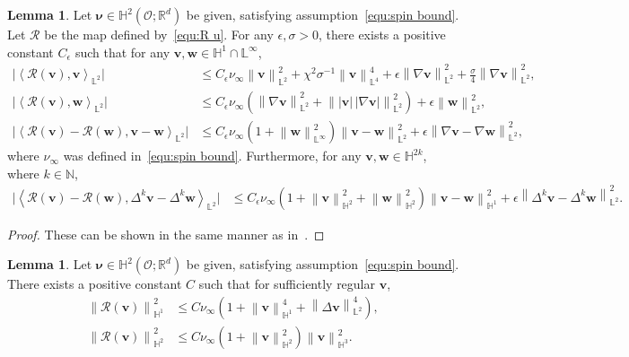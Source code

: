 \documentclass[11pt, reqno]{amsart}
\theoremstyle{definition}
\newtheorem{lemma}[theorem]{Lemma}
\numberwithin{equation}{section}
\newcommand{\bff}{\boldsymbol}
\newcommand{\bb}{\mathbb}
\newcommand{\norm}[2]{\left\|{#1}\right\|_{#2}}
\newcommand{\inpro}[2]{\left\langle#1,#2\right\rangle}
\begin{document}
\begin{lemma}
	Let $\bff{\nu}\in \bb{H}^2(\mathscr{O};\bb{R}^d)$ be given, satisfying assumption~\eqref{equ:spin bound}. Let $\mathcal{R}$ be the map defined by~\eqref{equ:R u}.
	For any $\epsilon, \sigma>0$, there exists a positive constant $C_\epsilon$ such that for any $\bff{v}, \bff{w} \in \bb{H}^1 \cap \bb{L}^\infty$,
	\begin{align}
        \label{equ:Rv v L2}
        \big| \inpro{\mathcal{R}(\bff{v})}{\bff{v}}_{\bb{L}^2} \big|
        &\leq
        C_\epsilon \nu_\infty \norm{\bff{v}}{\bb{L}^2}^2
        +
        \chi^2 \sigma^{-1} \norm{\bff{v}}{\bb{L}^4}^4
        +
        \epsilon \norm{\nabla \bff{v}}{\bb{L}^2}^2
		+
		\frac{\sigma}{4} \norm{\nabla \bff{v}}{\bb{L}^2}^2,
        \\
		\label{equ:Rv w}
		\big| \inpro{\mathcal{R}(\bff{v})}{\bff{w}}_{\bb{L}^2} \big|
		&\leq
		C_\epsilon \nu_\infty
		\left( \norm{\nabla \bff{v}}{\bb{L}^2}^2
		+
		\norm{|\bff{v}|\, |\nabla \bff{v}|}{\bb{L}^2}^2 \right)
		+
		\epsilon \norm{\bff{w}}{\bb{L}^2}^2,
		\\
		\label{equ:Rvw vw}
		\big| \inpro{\mathcal{R}(\bff{v})-\mathcal{R}(\bff{w})}{\bff{v}-\bff{w}}_{\bb{L}^2} \big|
		&\leq
		C_\epsilon \nu_\infty \left(1+\norm{\bff{w}}{\bb{L}^\infty}^2 \right)
		\norm{\bff{v}-\bff{w}}{\bb{L}^2}^2
		+
		\epsilon \norm{\nabla \bff{v}-\nabla \bff{w}}{\bb{L}^2}^2,
	\end{align}
 where $\nu_\infty$ was defined in~\eqref{equ:spin bound}. Furthermore, for any $\bff{v},\bff{w}\in \bb{H}^{2k}$, where $k\in \bb{N}$,
        \begin{align}
        \label{equ:Rvw Delta k}
        \Big| \inpro{\mathcal{R}(\bff{v})-\mathcal{R}(\bff{w})}{\Delta^k \bff{v}- \Delta^k \bff{w}}_{\bb{L}^2} \Big|
		&\leq
        C_\epsilon \nu_\infty \left(1+\norm{\bff{v}}{\bb{H}^2}^2+ \norm{\bff{w}}{\bb{H}^2}^2 \right) \norm{\bff{v}-\bff{w}}{\bb{H}^1}^2
        +
        \epsilon \norm{\Delta^k \bff{v}-\Delta^k \bff{w}}{\bb{L}^2}^2.
        \end{align}
\end{lemma}

\begin{proof}
	These can be shown in the same manner as in~\cite[Lemma~2.3]{GolSoeTra24b}.
\end{proof}

\begin{lemma}
Let $\bff{\nu}\in \bb{H}^2(\mathscr{O};\bb{R}^d)$ be given, satisfying assumption~\eqref{equ:spin bound}. There exists a positive constant $C$ such that for sufficiently regular $\bff{v}$,
\begin{align}
    \label{equ:nab Rv nab w}
        \norm{\mathcal{R}(\bff{v})}{\bb{H}^1}^2
        &\leq
       C \nu_\infty \left(1+ \norm{\bff{v}}{\bb{H}^1}^4 + \norm{\Delta \bff{v}}{\bb{L}^2}^4 \right),
       \\
    \label{equ:Rv Hs}
    \norm{\mathcal{R}(\bff{v})}{\bb{H}^2}^2
    &\leq
    C \nu_\infty \left(1+ \norm{\bff{v}}{\bb{H}^2}^2\right)
    \norm{\bff{v}}{\bb{H}^3}^2.
\end{align}
\end{lemma}
\end{document}
